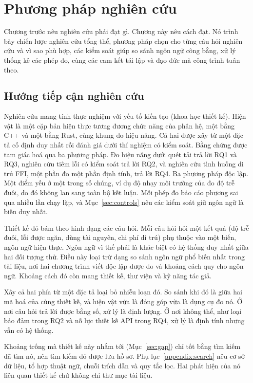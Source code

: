 \chapter{Phương pháp nghiên cứu\label{chapter:methodology}}

Chương trước nêu nghiên cứu phải đạt gì. Chương này nêu cách đạt. Nó trình bày chiến lược
nghiên cứu tổng thể, phương pháp chọn cho từng câu hỏi nghiên cứu và vì sao phù hợp, các kiểm
soát giúp so sánh ngôn ngữ công bằng, xử lý thống kê các phép đo, cùng các cam kết tái lập và đạo
đức mà công trình tuân theo.

\section{Hướng tiếp cận nghiên cứu}\label{sec:approach}
Nghiên cứu mang tính thực nghiệm với yếu tố kiến tạo (khoa học thiết kế). Hiện vật là một cặp
bản hiện thực tương đương chức năng của phân hệ, một bằng C++ và một bằng Rust, cùng khung đo
hiệu năng. Cả hai được xây từ một đặc tả cố định duy nhất rồi đánh giá dưới thí nghiệm có kiểm
soát. Bằng chứng được tam giác hoá qua ba phương pháp. Đo hiệu năng dưới quét tải trả lời RQ1 và
RQ3, nghiên cứu tiêm lỗi có kiểm soát trả lời RQ2, và nghiên cứu tình huống di trú FFI, một
phần đo một phần định tính, trả lời RQ4. Ba phương pháp độc lập. Một điểm yếu ở một trong số
chúng, ví dụ độ nhạy môi trường của đo độ trễ đuôi, do đó không lan sang toàn bộ kết luận. Mỗi
phép đo báo cáo phương sai qua nhiều lần chạy lặp, và Mục~\ref{sec:controls} nêu các kiểm soát
giữ ngôn ngữ là biến duy nhất.

Thiết kế đó bám theo hình dạng các câu hỏi. Mỗi câu hỏi hỏi một kết quả (độ trễ đuôi, lỗi được
ngăn, dùng tài nguyên, chi phí di trú) phụ thuộc vào một biến, ngôn ngữ hiện thực. Ngôn ngữ vì
thế phải là khác biệt có hệ thống duy nhất giữa hai đối tượng thử. Điều này loại trừ dạng so
sánh ngôn ngữ phổ biến nhất trong tài liệu, nơi hai chương trình viết độc lập được đo và khoảng
cách quy cho ngôn ngữ. Khoảng cách đó còn mang thiết kế, thư viện và kỹ năng tác giả.

Xây cả hai phía từ một đặc tả loại bỏ nhiễu loạn đó. So sánh khi đó là giữa hai mã hoá của cùng
thiết kế, và hiện vật vừa là đóng góp vừa là dụng cụ đo nó. Ở nơi câu hỏi trả lời được bằng số,
xử lý là định lượng. Ở nơi không thể, như loại bảo đảm trong RQ2 và nỗ lực thiết kế API trong
RQ4, xử lý là định tính nhưng vẫn có hệ thống.

Khoảng trống mà thiết kế này nhắm tới (Mục~\ref{sec:gap}) chỉ tốt bằng tìm kiếm đã tìm nó, nên
tìm kiếm đó được lưu hồ sơ. Phụ lục~\ref{appendix:search} nêu cơ sở dữ liệu, tổ hợp thuật ngữ,
chuỗi trích dẫn và quy tắc lọc. Hai phát hiện của nó liên quan thiết kế chứ không chỉ thư mục tài
liệu.

